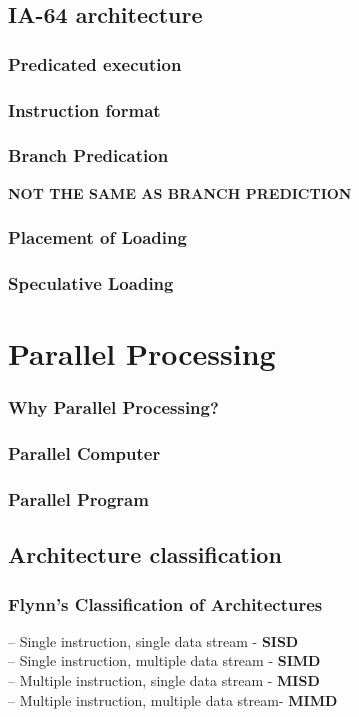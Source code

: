 \documentclass[titlepage, a4paper]{article}
\begin{document}
\subsection{IA-64 architecture}
\subsubsection{Predicated execution}
\subsubsection{Instruction format}
\subsubsection{Branch Predication}
\textbf{NOT THE SAME AS BRANCH PREDICTION}
\subsubsection{Placement of Loading}
\subsubsection{Speculative Loading}

\section{Parallel Processing}
\subsubsection{Why Parallel Processing?}
\subsubsection{Parallel Computer}
\subsubsection{Parallel Program}

\subsection{Architecture classification}
\subsubsection{Flynn’s Classification of Architectures}
-- Single instruction, single data stream - \textbf{SISD} \\
-- Single instruction, multiple data stream - \textbf{SIMD} \\
-- Multiple instruction, single data stream - \textbf{MISD} \\
-- Multiple instruction, multiple data stream- \textbf{MIMD} \\
\end{document}
